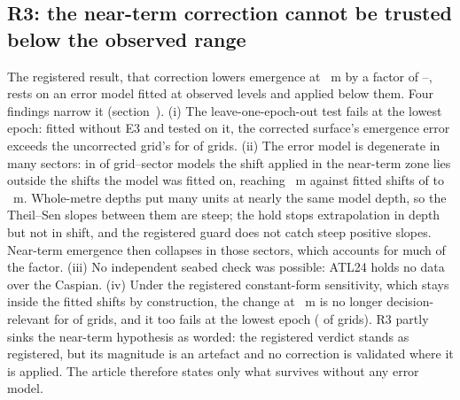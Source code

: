 \subsection*{R3: the near-term correction cannot be trusted below the observed range}
The registered result, that correction lowers emergence at ~m by a factor of --, rests on an error model fitted at observed levels and applied below them. Four findings narrow it (section~\SInearterm). (i) The leave-one-epoch-out test fails at the lowest epoch: fitted without E3 and tested on it, the corrected surface's emergence error exceeds the uncorrected grid's for  of  grids. (ii) The error model is degenerate in many sectors: in  of  grid--sector models the shift applied in the near-term zone lies outside the shifts the model was fitted on, reaching ~m against fitted shifts of  to ~m. Whole-metre depths put many units at nearly the same model depth, so the Theil--Sen slopes between them are steep; the hold stops extrapolation in depth but not in shift, and the registered guard does not catch steep positive slopes. Near-term emergence then collapses in those sectors, which accounts for much of the factor. (iii) No independent seabed check was possible: ATL24 holds no data over the Caspian. (iv) Under the registered constant-form sensitivity, which stays inside the fitted shifts by construction, the change at ~m is no longer decision-relevant for  of  grids, and it too fails at the lowest epoch ( of  grids). R3 partly sinks the near-term hypothesis as worded: the registered verdict stands as registered, but its magnitude is an artefact and no correction is validated where it is applied. The article therefore states only what survives without any error model.
